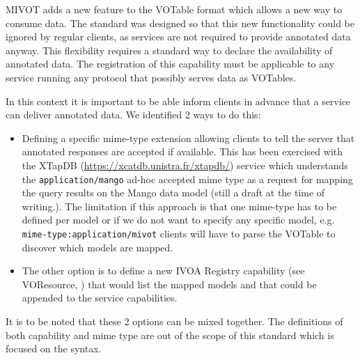 MIVOT adds a new feature to the VOTable format which allows a new way to consume data. 
The standard was designed so that this new functionality could be ignored by regular clients, 
as services are not required to provide annotated data anyway. 
This flexibility requires a standard way to declare the availability of annotated data. 
The registration of this capability must be applicable to any service running any protocol 
that possibly serves data as VOTables.

In this context it is important to be able inform clients in advance that a service can deliver annotated data.
We identified 2 ways to do this:
\begin{itemize}
    \item Defining a specific mime-type extension allowing clients to tell the server 
          that annotated responses are accepted if available. 
          This has been exercised with the XTapDB (\url{https://xcatdb.unistra.fr/xtapdb/}) service which understands 
          the \texttt{application/mango} ad-hoc accepted mime type as a request for mapping the query results on the Mango data model 
          (still a draft at the time of writing.). The limitation if this approach is that one mime-type has to 
          be defined per model or if we do not want to specify any specific model, e.g. \texttt{mime-type:application/mivot}
          clients will have to parse the VOTable to discover which models are mapped.
    \item The other option is to define a new IVOA Registry capability (see VOResource, \cite{2018ivoa.spec.0625P}) that 
    	  would list the mapped models and that could be appended to the service capabilities. 
\end{itemize}

It is to be noted that these 2 options can be mixed together.
The definitions of both capability and mime type are out of the scope of this standard which is focused on the syntax.

